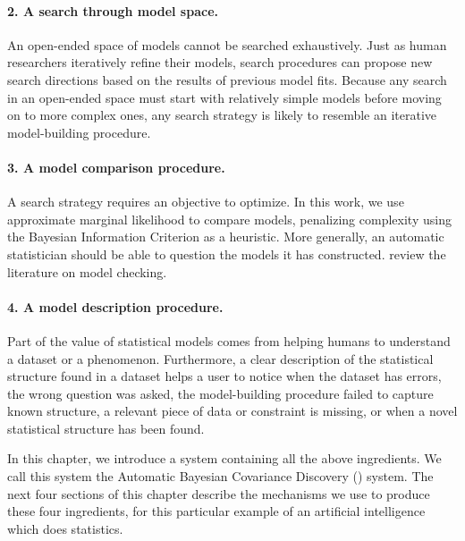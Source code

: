 \paragraph{2. A search through model space.}
An open-ended space of models cannot be searched exhaustively.
Just as human researchers iteratively refine their models, search procedures can propose new search directions based on the results of previous model fits.
Because any search in an open-ended space must start with relatively simple models before moving on to more complex ones, any search strategy is likely to resemble an iterative model-building procedure.

\paragraph{3. A model comparison procedure.}
A search strategy requires an objective to optimize.
In this work, we use approximate marginal likelihood to compare models, penalizing complexity using the Bayesian Information Criterion as a heuristic.
More generally, an automatic statistician should be able to question the models it has constructed.
\citet{gelman2012philosophy} review the literature on model checking.


\paragraph{4. A model description procedure.}
Part of the value of statistical models comes from helping humans to understand a dataset or a phenomenon.
Furthermore, a clear description of the statistical structure found in a dataset helps a user to notice when the dataset has errors, the wrong question was asked, the model-building procedure failed to capture known structure, a relevant piece of data or constraint is missing, or when a novel statistical structure has been found.





In this chapter, we introduce a system containing all the above ingredients.
We call this system the Automatic Bayesian Covariance Discovery (\procedurename{}) system.
The next four sections of this chapter describe the mechanisms we use to produce these four ingredients, for this particular example of an artificial intelligence which does statistics.



